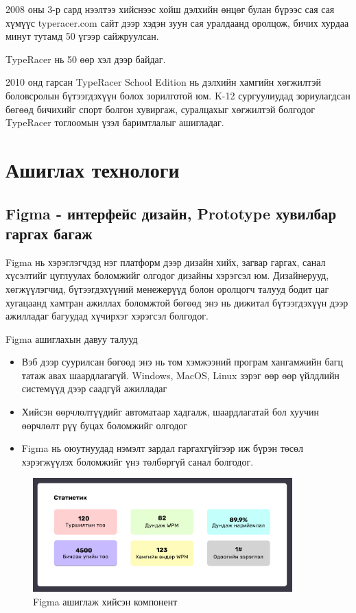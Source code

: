 2008 оны 3-р сард нээлтээ хийснээс хойш дэлхийн өнцөг булан бүрээс сая сая хүмүүс typeracer.com сайт дээр хэдэн зуун сая уралдаанд оролцож, бичих хурдаа минут тутамд 50 үгээр сайжруулсан.

TypeRacer нь 50 өөр хэл дээр байдаг.

2010 онд гарсан TypeRacer School Edition нь дэлхийн хамгийн хөгжилтэй боловсролын бүтээгдэхүүн болох зорилготой юм. K-12 сургуулиудад зориулагдсан бөгөөд бичихийг спорт болгон хувиргаж, суралцахыг хөгжилтэй болгодог TypeRacer тоглоомын үзэл баримтлалыг ашигладаг.
\section{Ашиглах технологи}

\subsection{Figma - интерфейс дизайн, Prototype хувилбар гаргах багаж}
Figma нь хэрэглэгчдэд нэг платформ дээр дизайн хийх, загвар гаргах, санал хүсэлтийг цуглуулах боломжийг олгодог дизайны хэрэгсэл юм. Дизайнерууд, хөгжүүлэгчид, бүтээгдэхүүний менежерүүд болон оролцогч талууд бодит цаг хугацаанд хамтран ажиллах боломжтой бөгөөд энэ нь дижитал бүтээгдэхүүн дээр ажилладаг багуудад хүчирхэг хэрэгсэл болгодог.

Figma ашиглахын давуу талууд
\begin{itemize}
	\item Вэб дээр суурилсан бөгөөд энэ нь том хэмжээний програм хангамжийн багц татаж авах шаардлагагүй. Windows, MacOS, Linux зэрэг өөр өөр үйлдлийн системүүд дээр саадгүй ажилладаг
	\item Хийсэн өөрчлөлтүүдийг автоматаар хадгалж, шаардлагатай бол хуучин өөрчлөлт рүү буцах боломжийг олгодог
	\item Figma нь оюутнуудад нэмэлт зардал гаргахгүйгээр иж бүрэн төсөл хэрэгжүүлэх боломжийг үнэ төлбөргүй санал болгодог.
\end{itemize}

\begin{figure}[h]
	\centering
	\includegraphics[width=10cm]{images/figma_component.png}
	\caption{Figma ашиглаж хийсэн компонент}
	\label{fig:figma}
\end{figure}

